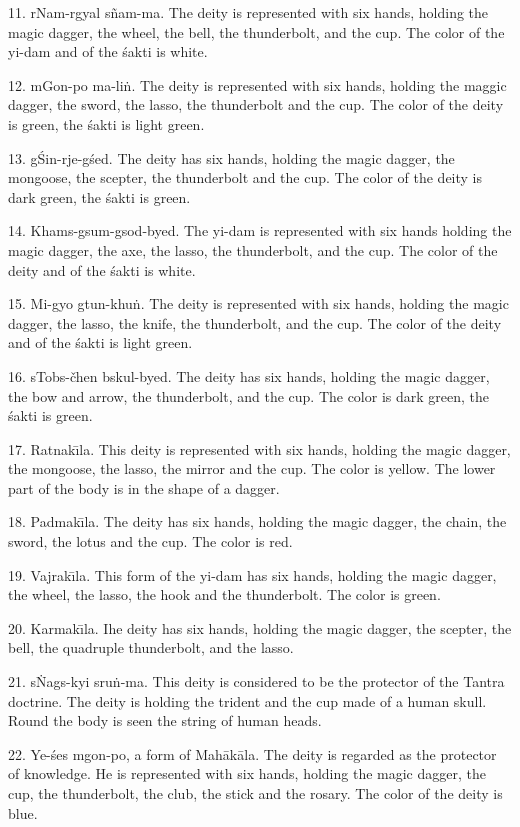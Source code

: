 \documentclass[a4paper, 12pt, oneside]{article}
\begin{document}
11. rNam-rgyal s\~{n}am-ma. The deity is represented with six hands, holding the magic dagger, the wheel, the bell, the thunderbolt, and the cup. The color of the yi-dam and of the \'{s}akti is white.

12. mGon-po ma-li\.{n}. The deity is represented with six hands, holding the maggic dagger, the sword, the lasso, the thunderbolt and the cup. The color of the deity is green, the \'{s}akti is light green.

13. g\'{S}in-rje-g\'{s}ed. The deity has six hands, holding the magic dagger, the mongoose, the scepter, the thunderbolt and the cup. The color of the deity is dark green, the \'{s}akti is green.

14. Khams-gsum-gsod-byed. The yi-dam is represented with six hands holding the magic dagger, the axe, the lasso, the thunderbolt, and the cup. The color of the deity and of the \'{s}akti is white.

15. Mi-gyo gtun-khu\.{n}. The deity is represented with six hands, holding the magic dagger, the lasso, the knife, the thunderbolt, and the cup. The color of the deity and of the \'{s}akti is light green.

16. sTobs-čhen bskul-byed. The deity has six hands, holding the magic dagger, the bow and arrow, the thunderbolt, and the cup. The color is dark green, the \'{s}akti is green.

17. Ratnak\={\i}la. This deity is represented with six hands, holding the magic dagger, the mongoose, the lasso, the mirror and the cup. The color is yellow. The lower part of the body is in the shape of a dagger.

18. Padmak\={\i}la. The deity has six hands, holding the magic dagger, the chain, the sword, the lotus and the cup. The color is red.

19. Vajrak\={\i}la. This form of the yi-dam has six hands, holding the magic dagger, the wheel, the lasso, the hook and the thunderbolt. The color is green.

20. Karmak\={\i}la. Ihe deity has six hands, holding the magic dagger, the scepter, the bell, the quadruple thunderbolt, and the lasso.

21. s\.{N}ags-kyi sru\.{n}-ma. This deity is considered to be the protector of the Tantra doctrine. The deity is holding the trident and the cup made of a human skull. Round the body is seen the string of human heads.

22. Ye-\'{s}es mgon-po, a form of Mah\={a}k\={a}la. The deity is regarded as the protector of knowledge. He is represented with six hands, holding the magic dagger, the cup, the thunderbolt, the club, the stick and the rosary. The color of the deity is blue.
\end{document}
